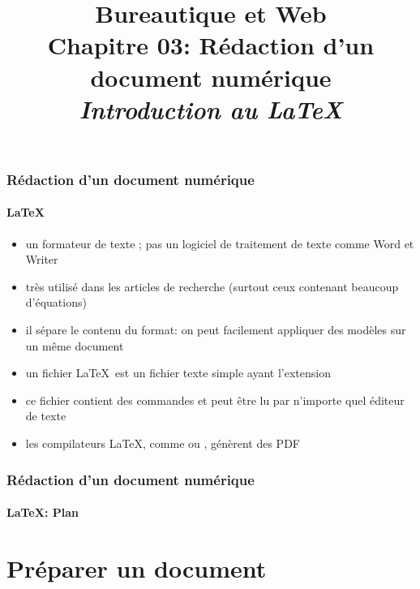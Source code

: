\documentclass[xcolor=table]{beamer}
\title[BWEB: 03- Rédaction (\LaTeX)] %
{Bureautique et Web \\Chapitre 03: Rédaction d'un document numérique \\ \slshape\small Introduction au \LaTeX}
\begin{document}
\begin{frame}
\frametitle{Rédaction d'un document numérique}
\framesubtitle{\LaTeX}

\begin{itemize}
	\item un formateur de texte ; pas un logiciel de traitement de texte comme Word et Writer
	\item très utilisé dans les articles de recherche (surtout ceux contenant beaucoup d'équations)
	\item il sépare le contenu du format: on peut facilement appliquer des modèles sur un même document
	\item un fichier \LaTeX\ est un fichier texte simple ayant l'extension 
	\item ce fichier contient des commandes et peut être lu par n'importe quel éditeur de texte
	\item les compilateurs \LaTeX, comme  ou , génèrent des PDF
	
\end{itemize}

\end{frame}

\begin{frame}
\frametitle{Rédaction d'un document numérique}
\framesubtitle{\LaTeX : Plan}

\begin{multicols}{2}
\tableofcontents
\end{multicols}
\end{frame}

\section{Préparer un document}
\end{document}
